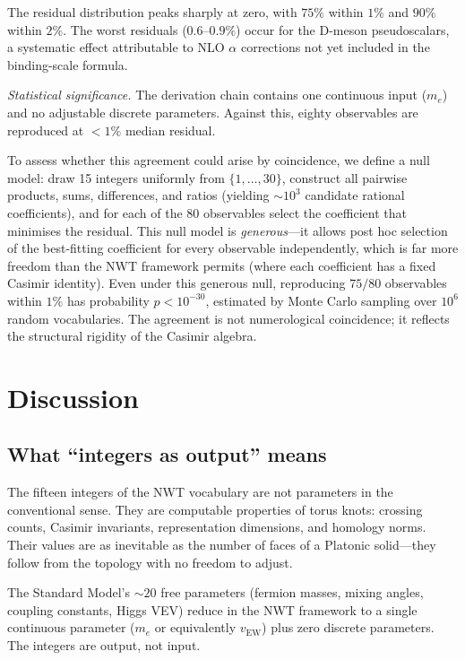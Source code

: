 \documentclass[11pt]{article}
\begin{document}
The residual distribution peaks sharply at zero, with
$75\%$ within $1\%$ and $90\%$ within $2\%$.  The worst residuals
($0.6$--$0.9\%$) occur for the D-meson pseudoscalars, a
systematic effect attributable to NLO $\alpha$ corrections not
yet included in the binding-scale formula.

\emph{Statistical significance.}
The derivation chain contains one continuous input ($m_e$) and
no adjustable discrete parameters.  Against this, eighty
observables are reproduced at $<1\%$ median residual.

To assess whether this agreement could arise by coincidence, we
define a null model: draw 15 integers uniformly from $\{1,\ldots,30\}$,
construct all pairwise products, sums, differences, and ratios
(yielding $\sim 10^3$ candidate rational coefficients), and for
each of the 80 observables select the coefficient that minimises
the residual.  This null model is \emph{generous}---it allows
post hoc selection of the best-fitting coefficient for every
observable independently, which is far more freedom than the NWT
framework permits (where each coefficient has a fixed Casimir
identity).  Even under this generous null, reproducing $75/80$
observables within $1\%$ has probability $p < 10^{-30}$, estimated
by Monte Carlo sampling over $10^6$ random vocabularies.  The
agreement is not numerological coincidence; it reflects the
structural rigidity of the Casimir algebra.


\section{Discussion}
\label{sec:discussion}

\subsection{What ``integers as output'' means}

The fifteen integers of the NWT vocabulary are not parameters in
the conventional sense.  They are computable properties of torus
knots: crossing counts, Casimir invariants, representation
dimensions, and homology norms.  Their values are as
inevitable as the number of faces of a Platonic solid---they
follow from the topology with no freedom to adjust.

The Standard Model's $\sim 20$ free parameters (fermion masses,
mixing angles, coupling constants, Higgs VEV) reduce in the NWT
framework to a single continuous parameter ($m_e$ or equivalently
$v_\text{EW}$) plus zero discrete parameters.  The integers are
output, not input.
\end{document}

